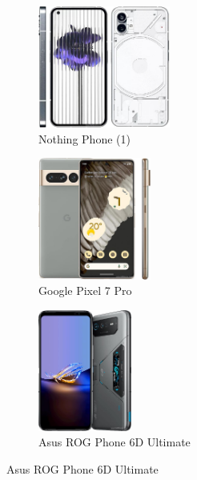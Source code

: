 \documentclass[10pt, UKenglish]{exam}
\begin{document}
\begin{figure}[htpb]
	\begin{subfigure}[htpb]{0.25\linewidth}
	\begin{center}
		\includegraphics[width=\linewidth,height=4cm,keepaspectratio]{nothing-phone-1}
	\end{center}
	\caption{Nothing Phone (1)}
	\label{fig:nothing-phone-1}
	\end{subfigure}
	\begin{subfigure}[htpb]{0.25\linewidth}
	\begin{center}
		\includegraphics[width=\linewidth,height=4cm,keepaspectratio]{google-pixel-7-pro}
	\end{center}
	\caption{Google Pixel 7 Pro}
	\label{fig:google-pixel-7-pro}
	\end{subfigure}
	\begin{subfigure}[htpb]{0.25\linewidth}
	\begin{center}
		\includegraphics[width=\linewidth,height=4cm,keepaspectratio]{asus-rog-phone-6d-ultimate}
	\end{center}
	\caption{Asus ROG Phone 6D Ultimate}
	\label{fig:asus-rog-phone-6d-ultimate}
	\end{subfigure}


\end{figure}
\end{document}
